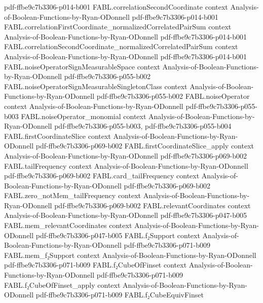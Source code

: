 \begin{theorem}
  {pdf-ffbe9c7b3306-p014-b001}
\proofstep
  {FABL.correlationSecondCoordinate}
  {context}
  {Analysis-of-Boolean-Functions-by-Ryan-ODonnell}
  {pdf-ffbe9c7b3306-p014-b001}
\proofstep
  {FABL.correlationFirstCoordinate_normalizedCorrelatedPairSum}
  {context}
  {Analysis-of-Boolean-Functions-by-Ryan-ODonnell}
  {pdf-ffbe9c7b3306-p014-b001}
\proofstep
  {FABL.correlationSecondCoordinate_normalizedCorrelatedPairSum}
  {context}
  {Analysis-of-Boolean-Functions-by-Ryan-ODonnell}
  {pdf-ffbe9c7b3306-p014-b001}
\proofstep
  {FABL.noiseOperatorSignMeasurableSpace}
  {context}
  {Analysis-of-Boolean-Functions-by-Ryan-ODonnell}
  {pdf-ffbe9c7b3306-p055-b002}
\proofstep
  {FABL.noiseOperatorSignMeasurableSingletonClass}
  {context}
  {Analysis-of-Boolean-Functions-by-Ryan-ODonnell}
  {pdf-ffbe9c7b3306-p055-b002}
\proofstep
  {FABL.noiseOperator}
  {context}
  {Analysis-of-Boolean-Functions-by-Ryan-ODonnell}
  {pdf-ffbe9c7b3306-p055-b003}
\proofstep
  {FABL.noiseOperator_monomial}
  {context}
  {Analysis-of-Boolean-Functions-by-Ryan-ODonnell}
  {pdf-ffbe9c7b3306-p055-b003,
    pdf-ffbe9c7b3306-p055-b004}
\proofstep
  {FABL.firstCoordinateSlice}
  {context}
  {Analysis-of-Boolean-Functions-by-Ryan-ODonnell}
  {pdf-ffbe9c7b3306-p069-b002}
\proofstep
  {FABL.firstCoordinateSlice_apply}
  {context}
  {Analysis-of-Boolean-Functions-by-Ryan-ODonnell}
  {pdf-ffbe9c7b3306-p069-b002}
\proofstep
  {FABL.tailFrequency}
  {context}
  {Analysis-of-Boolean-Functions-by-Ryan-ODonnell}
  {pdf-ffbe9c7b3306-p069-b002}
\proofstep
  {FABL.card_tailFrequency}
  {context}
  {Analysis-of-Boolean-Functions-by-Ryan-ODonnell}
  {pdf-ffbe9c7b3306-p069-b002}
\proofstep
  {FABL.zero_notMem_tailFrequency}
  {context}
  {Analysis-of-Boolean-Functions-by-Ryan-ODonnell}
  {pdf-ffbe9c7b3306-p069-b002}
\proofstep
  {FABL.relevantCoordinates}
  {context}
  {Analysis-of-Boolean-Functions-by-Ryan-ODonnell}
  {pdf-ffbe9c7b3306-p047-b005}
\proofstep
  {FABL.mem_relevantCoordinates}
  {context}
  {Analysis-of-Boolean-Functions-by-Ryan-ODonnell}
  {pdf-ffbe9c7b3306-p047-b005}
\proofstep
  {FABL.f₂Support}
  {context}
  {Analysis-of-Boolean-Functions-by-Ryan-ODonnell}
  {pdf-ffbe9c7b3306-p071-b009}
\proofstep
  {FABL.mem_f₂Support}
  {context}
  {Analysis-of-Boolean-Functions-by-Ryan-ODonnell}
  {pdf-ffbe9c7b3306-p071-b009}
\proofstep
  {FABL.f₂CubeOfFinset}
  {context}
  {Analysis-of-Boolean-Functions-by-Ryan-ODonnell}
  {pdf-ffbe9c7b3306-p071-b009}
\proofstep
  {FABL.f₂CubeOfFinset_apply}
  {context}
  {Analysis-of-Boolean-Functions-by-Ryan-ODonnell}
  {pdf-ffbe9c7b3306-p071-b009}
\proofstep
  {FABL.f₂CubeEquivFinset}

\end{theorem}
